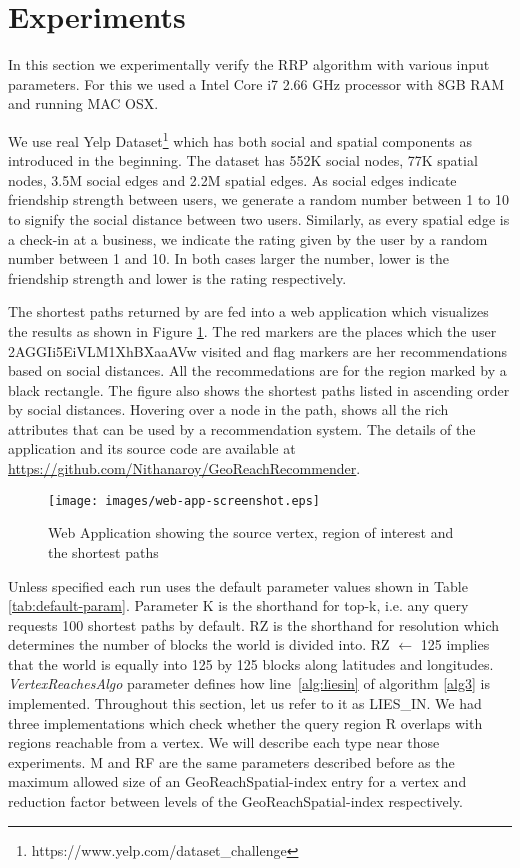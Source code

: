 \section{Experiments} \label{sec:experiment}

In this section we experimentally verify the RRP algorithm with various input parameters. For this we used a Intel Core i7 2.66 GHz processor with 8GB RAM and running MAC OSX. 

We use real Yelp Dataset\footnote{https://www.yelp.com/dataset\_challenge} which has both social and spatial components as introduced in the beginning. The dataset has 552K social nodes, 77K spatial nodes, 3.5M social edges and 2.2M spatial edges. As social edges indicate friendship strength between users, we generate a random number between 1 to 10 to signify the social distance between two users. Similarly, as every spatial edge is a check-in at a business, we indicate the rating given by the user by a random number between 1 and 10. In both cases larger the number, lower is the friendship strength and lower is the rating respectively. 

The shortest paths returned by {\rrp} are fed into a web application which visualizes the results as shown in Figure \ref{fig:web-app}. The red markers are the places which the user 2AGGIi5EiVLM1XhBXaaAVw visited and flag markers are her recommendations based on social distances. All the recommedations are for the region marked by a black rectangle. The figure also shows the shortest paths listed in ascending order by social distances. Hovering over a node in the path, shows all the rich attributes that can be used by a recommendation system. The details of the application and its source code are available at \url{https://github.com/Nithanaroy/GeoReachRecommender}.

\begin{figure}[t]
	\centering \texttt{[image: images/web-app-screenshot.eps]}
    \caption{Web Application showing the source vertex, region of interest and the shortest paths}
    \label{fig:web-app}
\end{figure}

Unless specified each run uses the default parameter values shown in Table \ref{tab:default-param}. Parameter K is the shorthand for top-k, i.e. any query requests 100 shortest paths by default. RZ is the shorthand for resolution which determines the number of blocks the world is divided into. RZ $\gets$ 125 implies that the world is equally into 125 by 125 blocks along latitudes and longitudes. \textit{VertexReachesAlgo} parameter defines how line~\ref{alg:liesin} of algorithm \ref{alg3} is implemented. Throughout this section, let us refer to it as LIES\_IN. We had three implementations which check whether the query region R overlaps with regions reachable from a vertex. We will describe each type near those experiments. M and RF are the same parameters described before as the maximum allowed size of an GeoReachSpatial-index entry for a vertex and reduction factor between levels of the GeoReachSpatial-index respectively.

